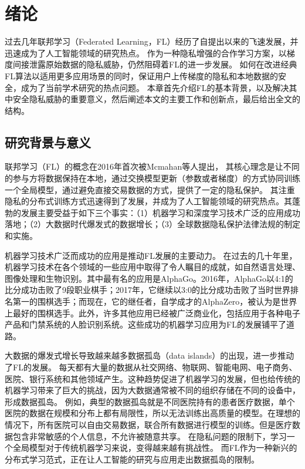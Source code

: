\chapter{绪论}
过去几年联邦学习（Federated Learning，FL）经历了自提出以来的飞速发展，并迅速成为了人工智能领域的研究热点。
作为一种隐私增强的合作学习方案，以梯度间接泄露原始数据的隐私威胁，仍然阻碍着FL的进一步发展。
如何在改进经典FL算法以适用更多应用场景的同时，保证用户上传梯度的隐私和本地数据的安全，成为了当前学术研究的热点问题。
本章首先介绍FL的基本背景，以及解决其中安全隐私威胁的重要意义，然后阐述本文的主要工作和创新点，最后给出全文的结构。

\section{研究背景与意义} 
联邦学习（FL）的概念在2016年首次被Mcmahan等人\cite{mcmahan2017communication}提出，
其核心理念是让不同的参与方将数据保持在本地，通过交换模型更新（参数或者梯度）的方式协同训练一个全局模型，通过避免直接交易数据的方式，提供了一定的隐私保护。
其注重隐私的分布式训练方式迅速得到了发展，并成为了人工智能领域的研究热点\cite{bhagoji2019analyzing}。其蓬勃的发展主要受益于如下三个事实：（1）机器学习和深度学习技术广泛的应用成功落地；（2）大数据时代爆发式的数据增长；（3）全球数据隐私保护法律法规的制定和实施。

机器学习技术广泛而成功的应用是推动FL发展的主要动力。
在过去的几十年里，机器学习技术在各个领域的一些应用中取得了令人瞩目的成就，如自然语言处理\cite{devlin2018bert}、图像处理\cite{zhu2020neural}和生物识别\cite{yin20193d}。其中最有名的应用是AlphaGo\cite{silver2017mastering}。2016年，AlphaGo以4:1的比分成功击败了9段职业棋手；2017年，它继续以3:0的比分成功击败了当时世界排名第一的围棋选手；而现在，它的继任者，自学成才的AlphaZero，被认为是世界上最好的围棋选手。此外，许多其他应用已经被广泛商业化，包括应用于各种电子产品和门禁系统的人脸识别系统。这些成功的机器学习应用为FL的发展铺平了道路。

大数据的爆发式增长导致越来越多数据孤岛（data islands）的出现，进一步推动了FL的发展。
每天都有大量的数据从社交网络、物联网、智能电网、电子商务、医院、银行系统和其他领域产生\cite{hu2016energy}。这种趋势促进了机器学习的发展，但也给传统的机器学习带来了巨大的挑战，因为大数据通常被不同的组织存储在不同的设备中，形成数据孤岛。
例如，典型的数据孤岛就是不同医院持有的患者医疗数据，单个医院的数据在规模和分布上都有局限性，所以无法训练出高质量的模型。在理想的情况下，所有医院可以自由交易数据，联合所有数据进行模型的训练。但是医疗数据包含非常敏感的个人信息，不允许被随意共享。
在隐私问题的限制下，学习一个全局模型对于传统机器学习来说，变得越来越有挑战性。
而FL作为一种新兴的分布式学习范式，正在让人工智能的研究与应用走出数据孤岛的限制。

